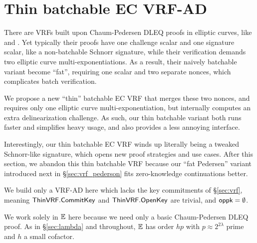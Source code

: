 
\section{Thin batchable EC VRF-AD}
\label{sec:vrf_thin}

There are VRFs built upon Chaum-Pedersen DLEQ proofs in elliptic curves,
 like \cite{nsec5} and \cite{VXEd25519}.
Yet typically their proofs have one challenge scalar and one signature
scalar, like a non-batchable Schnorr signature, while 
their verification demands two elliptic curve multi-exponentiations.
As a result, their naively batchable variant become ``fat'', requiring
one scalar and two separate nonces, which complicates batch verification.

We propose a new ``thin'' batchable EC VRF that merges these two nonces,
and requires only one elliptic curve multi-exponentiation, but
internally computes an extra delinearization challenge.
As such, our thin batchable variant both runs faster and simplifies heavy usage,
and also provides a less annoying interface.

Interestingly, our thin batchable EC VRF winds up literally being
a tweaked Schnorr-like signature, which opens new proof strategies and
use cases.  After this section, we abandon this thin batchable VRF
because our ``fat Pedersen'' variant introduced next in \S\ref{sec:vrf_pederson}
fits zero-knowledge continuations better.

\smallskip

\newcommand{\ThinVRF}{\primalgo{ThinVRF}} 


We build only a VRF-AD here which lacks the key commitments of \S\ref{sec:vrf},
meaning $\ThinVRF.\CommitKey$ and $\ThinVRF.\OpenKey$ are trivial, and $\mathsf{oppk} = \emptyset$.

We work solely in ${\mathbb{E}}$ here because we need only a basic Chaum-Pedersen DLEQ proof.
As in \S\ref{sec:lambda} and throughout,
 ${\mathbb{E}}$ has order $h p$ with $p \approx 2^{2\lambda}$ prime and $h$ a small cofactor.

